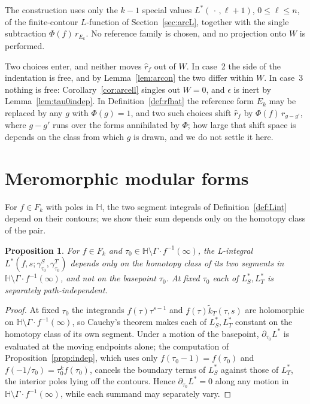 \documentclass[11pt]{article}
\newtheorem{proposition}[theorem]{Proposition}
\newcommand{\HH}{\mathbb{H}}
\newcommand{\tk}{\widetilde{k}_T}
\begin{document}
The construction uses only the $k-1$ special values $L^*(\,\cdot\,,\ell+1)$, $0\le\ell\le n$, of
the finite-contour $L$-function of Section~\ref{sec:arcL}, together with the single subtraction
$\Phi(f)\,r_{E_k}$. No reference family is chosen, and no projection onto $W$ is performed.

Two choices enter, and neither moves $\hat r_f$ out of $W$. In case~2 the side of the indentation
is free, and by Lemma~\ref{lem:arcon} the two differ within $W$. In case~3 nothing is free:
Corollary~\ref{cor:arcell} singles out $W=0$, and $\epsilon$ is inert by
Lemma~\ref{lem:tau0indep}. In Definition~\ref{def:rfhat} the reference
form $E_k$ may be replaced by any $g$ with $\Phi(g)=1$, and two such choices shift $\hat r_f$ by
$\Phi(f)\,r_{g-g'}$, where $g-g'$ runs over the forms annihilated by $\Phi$; how large that shift
space is depends on the class from which $g$ is drawn, and we do not settle it here.

\appendix 

\section{Meromorphic modular forms}\label{sec:mero}

For $f\in F_k$ with poles in $\HH$, the two segment integrals of
Definition~\ref{def:Lint} depend on their contours; we show their sum depends only on the
homotopy class of the pair.

\begin{proposition}\label{prop:indepHomotopy}
For $f\in F_k$ and $\tau_0\in\HH\setminus\Gamma\!\cdot\!f^{-1}(\infty)$, the L-integral
$L^*(f,s;\gamma^S_{\tau_0},\gamma^T_{\tau_0})$ depends only on the homotopy class of its
two segments in $\HH\setminus\Gamma\!\cdot\!f^{-1}(\infty)$, and not on the basepoint
$\tau_0$. At fixed $\tau_0$ each of $L^*_S,L^*_T$ is separately path-independent.
\end{proposition}

\begin{proof}
At fixed $\tau_0$ the integrands $f(\tau)\tau^{s-1}$ and $f(\tau)\tk(\tau,s)$ are
holomorphic on $\HH\setminus\Gamma\!\cdot\!f^{-1}(\infty)$, so Cauchy's theorem makes each
of $L^*_S,L^*_T$ constant on the homotopy class of its own segment. Under a motion of the
basepoint, $\partial_{\tau_0}L^*$ is evaluated at the moving endpoints alone; the
computation of Proposition~\ref{prop:indep}, which uses only $f(\tau_0-1)=f(\tau_0)$ and
$f(-1/\tau_0)=\tau_0^{k}f(\tau_0)$, cancels the boundary terms of $L^*_S$ against those
of $L^*_T$, the interior poles lying off the contours. Hence $\partial_{\tau_0}L^*=0$ along
any motion in $\HH\setminus\Gamma\!\cdot\!f^{-1}(\infty)$, while each summand may 
separately vary.
\end{proof}
\end{document}
